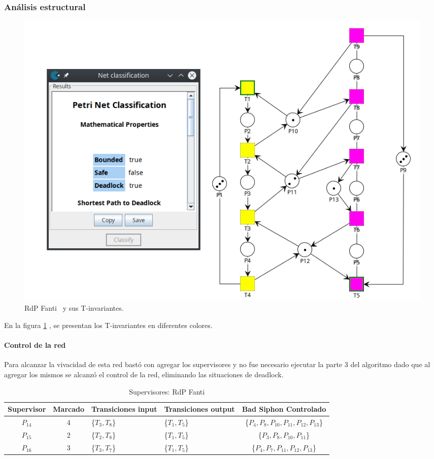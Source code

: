 \subsubsection{Análisis estructural}
\hfill
\begin{figure}[H]
	\centering
	\includegraphics[width=\textwidth]{Figures/testing/fanti_tinvariantes.png}
	\caption[RdP Fanti y sus T-invariantes.]{RdP Fanti \footnotemark \ y sus T-invariantes.}
	\label{fig:fanti_tinvariantes}
 \end{figure} 

En la figura \ref{fig:fanti_tinvariantes} , se presentan los T-invariantes en diferentes colores.\\

\paragraph{Control de la red}
\hfill \break
Para alcanzar la vivacidad de esta red bastó con agregar los supervisores y no fue necesario ejecutar la parte 3 del algoritmo dado que al agregar los mismos se alcanzó el control de la red, eliminando las situaciones de deadlock.
\begin{table}[H]
    \small
    \centering
    \begin{tabular}{|c|c|P{2cm}|P{2.3cm}|c|}
    \hline
    \textbf{Supervisor} & \textbf{Marcado} & \textbf{Transiciones input} & \textbf{Transiciones output} & \textbf{Bad Siphon Controlado}  \\  \hline
    $P_{14}$ & 4 & \{$T_{3},T_{8}$\} & \{$T_{1},T_{5}$\} & \{$P_4, P_8, P_{10}, P_{11}, P_{12}, P_{13} $\} \\ 
    \hline
    $P_{15}$ & 2 & \{$T_{2}, T_{8}$\} & \{$T_1,T_5$\} & \{$P_3, P_8, P_{10}, P_{11}$\} \\ 
    \hline
    $P_{16}$ & 3 & \{$T_{3}, T_{7}$\} & \{$T_1,T_5$\} & \{$P_4, P_7, P_{11}, P_{12}, P_{13}$\} \\ 
    \hline
    \end{tabular}
    \caption{Supervisores: RdP Fanti}
    \label{tab:fanti}
\end{table}
\hfill

